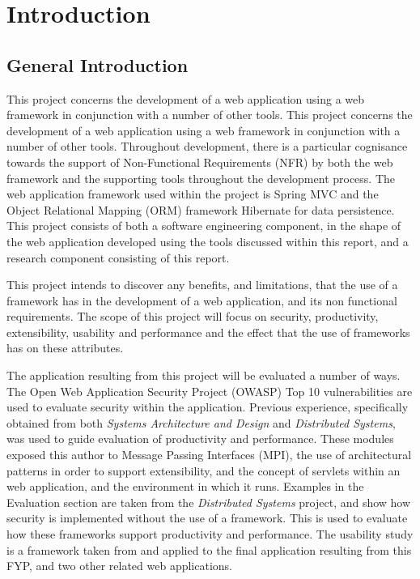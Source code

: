 \chapter{Introduction}
\label{intro}

\section{General Introduction}

This project concerns the development of a web application using a web framework in conjunction with a number of other tools. This project concerns the development of a web application using a web framework in conjunction with a number of other tools. Throughout development, there is a particular cognisance towards the support of Non-Functional Requirements (NFR) by both the web framework and the supporting tools throughout the development process.  The web application framework used within the project is Spring MVC and the Object Relational Mapping (ORM) framework Hibernate for data persistence. This project consists of both a software engineering component, in the shape of the web application developed using the tools discussed within this report, and a research component consisting of this report.

This project intends to discover any benefits, and limitations, that the use of a framework has in the development of a web application, and its non functional requirements. The scope of this project will focus on security, productivity, extensibility, usability and performance and the effect that the use of frameworks has on these attributes.

The application resulting from this project will be evaluated a number of ways. The Open Web Application Security Project (OWASP) Top 10 vulnerabilities are used to evaluate security within the application. Previous experience, specifically obtained from both \textit{Systems Architecture and Design} and \textit{Distributed Systems}, was used to guide evaluation of productivity and performance. These modules exposed this author to Message Passing Interfaces (MPI), the use of architectural patterns in order to support extensibility, and the concept of servlets within an web application, and the environment in which it runs. Examples in the Evaluation section are taken from the \textit{Distributed Systems} project, and show how security is implemented without the use of a framework. This is used to evaluate how these frameworks support productivity and performance. The usability study is a framework taken from \parencite{holzinger2005usability} and applied to the final application resulting from this FYP, and two other related web applications. 



